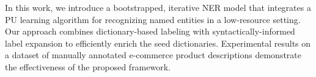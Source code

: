 In this work, we introduce a bootstrapped, iterative NER model that integrates a PU learning algorithm for recognizing named entities in a low-resource setting. Our approach combines dictionary-based labeling with syntactically-informed label expansion to efficiently enrich the seed dictionaries. Experimental results on a dataset of manually annotated e-commerce product descriptions demonstrate the effectiveness of the proposed framework.

